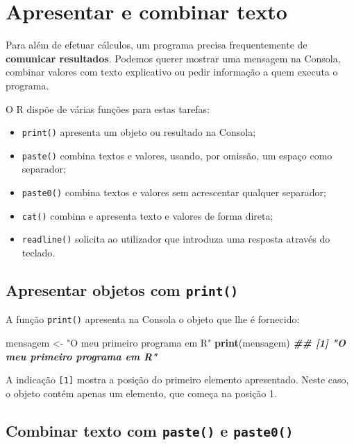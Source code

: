 \documentclass[
  portuguese,
  11pt,
  openany]{book}
\newenvironment{Shaded}{\begin{snugshade}}{\end{snugshade}}
\newcommand{\DocumentationTok}[1]{\textcolor[rgb]{0.56,0.35,0.01}{\textbf{\textit{#1}}}}
\newcommand{\FunctionTok}[1]{\textcolor[rgb]{0.13,0.29,0.53}{\textbf{#1}}}
\newcommand{\NormalTok}[1]{#1}
\newcommand{\OtherTok}[1]{\textcolor[rgb]{0.56,0.35,0.01}{#1}}
\newcommand{\StringTok}[1]{\textcolor[rgb]{0.31,0.60,0.02}{#1}}
\providecommand{\tightlist}{%
  \setlength{\itemsep}{0pt}\setlength{\parskip}{0pt}}
\begin{document}
\section{Apresentar e combinar texto}\label{apresentar-e-combinar-texto}

Para além de efetuar cálculos, um programa precisa frequentemente de \textbf{comunicar resultados}. Podemos querer mostrar uma mensagem na Consola, combinar valores com texto explicativo ou pedir informação a quem executa o programa.

O R dispõe de várias funções para estas tarefas:

\begin{itemize}
\tightlist
\item
  \texttt{print()} apresenta um objeto ou resultado na Consola;
\item
  \texttt{paste()} combina textos e valores, usando, por omissão, um espaço como separador;
\item
  \texttt{paste0()} combina textos e valores sem acrescentar qualquer separador;
\item
  \texttt{cat()} combina e apresenta texto e valores de forma direta;
\item
  \texttt{readline()} solicita ao utilizador que introduza uma resposta através do teclado.
\end{itemize}

\subsection{\texorpdfstring{Apresentar objetos com \texttt{print()}}{Apresentar objetos com print()}}\label{apresentar-objetos-com-print}

A função \texttt{print()} apresenta na Consola o objeto que lhe é fornecido:

\begin{Shaded}
\begin{Highlighting}[]
\NormalTok{mensagem }\OtherTok{\textless{}{-}} \StringTok{"O meu primeiro programa em R"}
\FunctionTok{print}\NormalTok{(mensagem)}
\DocumentationTok{\#\# [1] "O meu primeiro programa em R"}
\end{Highlighting}
\end{Shaded}

A indicação \texttt{{[}1{]}} mostra a posição do primeiro elemento apresentado. Neste caso, o objeto contém apenas um elemento, que começa na posição 1.

\subsection{\texorpdfstring{Combinar texto com \texttt{paste()} e \texttt{paste0()}}{Combinar texto com paste() e paste0()}}\label{combinar-texto-com-paste-e-paste0}
\end{document}
